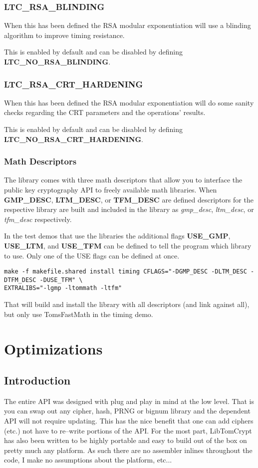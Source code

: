 \documentclass[synpaper]{book}
\newcommand{\mysection}[1]    %
	{                   %
	\section{#1}
   \markboth{\textsf{www.libtom.net}}{\thesection ~ {#1}}
	}
\begin{document}
\subsection{LTC\_RSA\_BLINDING}
When this has been defined the RSA modular exponentiation will use a blinding algorithm to improve timing resistance.

This is enabled by default and can be disabled by defining \textbf{LTC\_NO\_RSA\_BLINDING}.

\subsection{LTC\_RSA\_CRT\_HARDENING}
When this has been defined the RSA modular exponentiation will do some sanity checks regarding the CRT parameters and the operations' results.

This is enabled by default and can be disabled by defining \textbf{LTC\_NO\_RSA\_CRT\_HARDENING}.

\subsection{Math Descriptors}
The library comes with three math descriptors that allow you to interface the public key cryptography API to freely available math
libraries.  When \textbf{GMP\_DESC}, \textbf{LTM\_DESC}, or \textbf{TFM\_DESC} are defined
descriptors for the respective library are built and included in the library as \textit{gmp\_desc}, \textit{ltm\_desc}, or \textit{tfm\_desc} respectively.

In the test demos that use the libraries the additional flags \textbf{USE\_GMP}, \textbf{USE\_LTM}, and \textbf{USE\_TFM} can be defined
to tell the program which library to use.  Only one of the USE flags can be defined at once.

     
\begin{small}
\begin{verbatim}
make -f makefile.shared install timing CFLAGS="-DGMP_DESC -DLTM_DESC -DTFM_DESC -DUSE_TFM" \
EXTRALIBS="-lgmp -ltommath -ltfm"
\end{verbatim}
\end{small}

That will build and install the library with all descriptors (and link against all), but only use TomsFastMath in the timing demo.

\chapter{Optimizations}
\mysection{Introduction}
The entire API was designed with plug and play in mind at the low level.  That is you can swap out any cipher, hash, PRNG or bignum library and the dependent API will not
require updating.  This has the nice benefit that one can add ciphers (etc.) not have to re--write portions of the API.  For the most part, LibTomCrypt has also been written
to be highly portable and easy to build out of the box on pretty much any platform.  As such there are no assembler inlines throughout the code, I make no assumptions
about the platform, etc...
\end{document}
